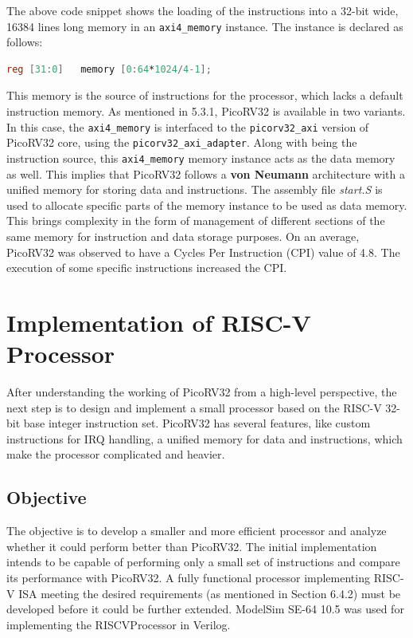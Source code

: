The above code snippet shows the loading of the instructions into a 32-bit wide, 16384 lines long memory in an \verb|axi4_memory| instance. The instance is declared as follows:\newline
\begin{lstlisting}[language=Verilog]
reg [31:0]   memory [0:64*1024/4-1];
\end{lstlisting}
This memory is the source of instructions for the processor, which lacks a default instruction memory. As mentioned in 5.3.1, PicoRV32 is available in two variants. In this case, the \verb|axi4_memory| is interfaced to the \verb|picorv32_axi| version of PicoRV32 core, using the \verb|picorv32_axi_adapter|. \newline\newline
Along with being the instruction source, this \verb|axi4_memory| memory instance acts as the data memory as well. This implies that PicoRV32 follows a \textbf{von Neumann} architecture with a unified memory for storing data and instructions. The assembly file \textit{start.S} is used to allocate specific parts of the memory instance to be used as data memory. This brings complexity in the form of management of different sections of the same memory for instruction and data storage purposes.\newline\newline
On an average, PicoRV32 was observed to have a Cycles Per Instruction (CPI) value of 4.8. The execution of some specific instructions increased the CPI. 

 \section{Implementation of RISC-V Processor}
 \label{sect6_4}
After understanding the working of PicoRV32 from a high-level perspective, the next step is to design and implement a small processor based on the RISC-V 32-bit base integer instruction set. PicoRV32 has several features, like custom instructions for IRQ handling, a unified memory for data and instructions, which make the processor complicated and heavier.

\subsection{Objective}
\label{sect6_4_1}
The objective is to develop a smaller and more efficient processor and analyze whether it could perform better than PicoRV32. The initial implementation intends to be capable of performing only a small set of instructions and compare its performance with PicoRV32. A fully functional processor implementing RISC-V ISA meeting the desired requirements (as mentioned in Section 6.4.2) must be developed before it could be further extended.\newline\newline
ModelSim SE-64 10.5 was used for implementing the RISCVProcessor in Verilog.

